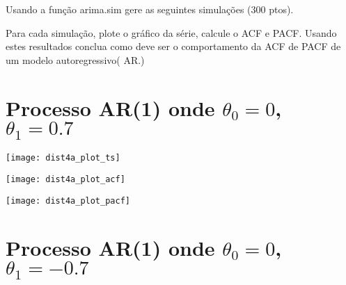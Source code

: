 Usando a função arima.sim gere as seguintes simulações (300 ptos).

Para cada simulação, plote o gráfico da série, calcule o ACF e PACF. Usando estes resultados conclua como deve ser o comportamento da ACF de PACF de um modelo autoregressivo( AR.)

\section{Processo AR(1) onde $\theta_{0}=0$, $\theta_{1}=0.7$}

\begin{center}
\begin{centering}
\texttt{[image: dist4a\_plot\_ts]}
\par\end{centering}
\par\end{center}


\begin{center}
\begin{centering}
\texttt{[image: dist4a\_plot\_acf]}
\par\end{centering}
\par\end{center}

\begin{center}
\begin{centering}
\texttt{[image: dist4a\_plot\_pacf]}
\par\end{centering}
\par\end{center}



\section{Processo AR(1) onde $\theta_{0}=0$, $\theta_{1}=-0.7$}

